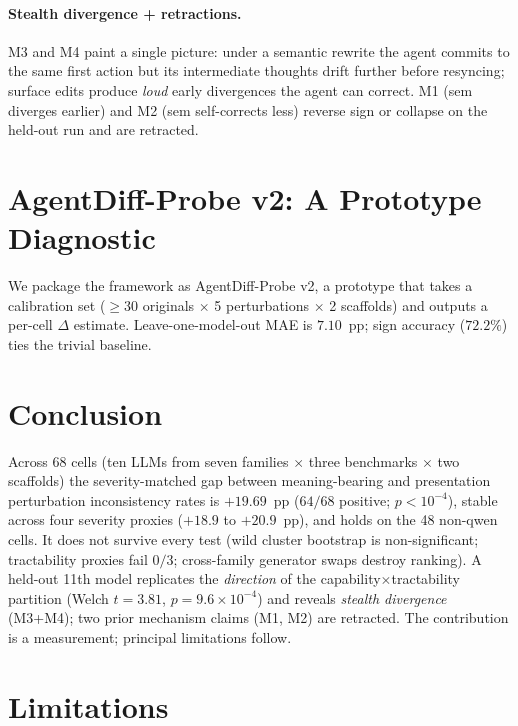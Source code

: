 \documentclass[11pt]{article}
\begin{document}
\paragraph{Stealth divergence + retractions.} M3 and M4 paint a single picture: under a semantic rewrite the agent commits to the same first action but its intermediate thoughts drift further before resyncing; surface edits produce \emph{loud} early divergences the agent can correct. M1 (sem diverges earlier) and M2 (sem self-corrects less) reverse sign or collapse on the held-out run and are retracted.


\section{AgentDiff-Probe v2: A Prototype Diagnostic}
\label{sec:probe}

We package the framework as AgentDiff-Probe v2, a prototype that takes a calibration set ($\geq 30$ originals $\times$ 5 perturbations $\times$ 2 scaffolds) and outputs a per-cell $\Delta$ estimate. Leave-one-model-out MAE is $7.10$~pp; sign accuracy ($72.2\%$) ties the trivial baseline.


\section{Conclusion}
\label{sec:conclusion}

Across 68 cells (ten LLMs from seven families $\times$ three benchmarks $\times$ two scaffolds) the severity-matched gap between meaning-bearing and presentation perturbation inconsistency rates is $+19.69$~pp ($64/68$ positive; $p{<}10^{-4}$), stable across four severity proxies ($+18.9$ to $+20.9$~pp), and holds on the 48 non-qwen cells. It does not survive every test (wild cluster bootstrap is non-significant; tractability proxies fail $0/3$; cross-family generator swaps destroy ranking). A held-out 11th model replicates the \emph{direction} of the capability$\times$tractability partition (Welch $t{=}3.81$, $p{=}9.6\!\times\!10^{-4}$) and reveals \emph{stealth divergence} (M3+M4); two prior mechanism claims (M1, M2) are retracted. The contribution is a measurement; principal limitations follow.


\section*{Limitations}
\end{document}
